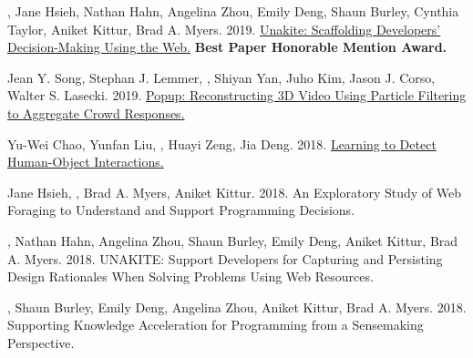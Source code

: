 



\begin{cvpubs}

  {, Jane Hsieh, Nathan Hahn, Angelina Zhou, Emily Deng, Shaun Burley, Cynthia Taylor, Aniket Kittur, Brad A. Myers. 2019. \href{http://dx.doi.org/10.1145/3332165.3347908}{Unakite: Scaffolding Developers' Decision-Making Using the Web.}  \textbf{Best Paper Honorable Mention Award.}} %

{Jean Y. Song, Stephan J. Lemmer, , Shiyan Yan, Juho Kim, Jason J. Corso, Walter S. Lasecki. 2019. \href{https://doi.org/10.1145/3301275.3302305}{Popup: Reconstructing 3D Video Using Particle Filtering to Aggregate Crowd Responses.} } %

{Yu-Wei Chao, Yunfan Liu, , Huayi Zeng, Jia Deng. 2018. \href{https://doi.org/10.1109/WACV.2018.00048}{Learning to Detect Human-Object Interactions.} } %
\end{cvpubs}




\begin{cvpubs}
{Jane Hsieh, , Brad A. Myers, Aniket Kittur. 2018. An Exploratory Study of Web Foraging to Understand and Support Programming Decisions. } %
\end{cvpubs}




\begin{cvpubs}
{, Nathan Hahn, Angelina Zhou, Shaun Burley, Emily Deng, Aniket Kittur, Brad A. Myers. 2018. UNAKITE: Support Developers for Capturing and Persisting Design Rationales When Solving Problems Using Web Resources. } %

{, Shaun Burley, Emily Deng, Angelina Zhou, Aniket Kittur, Brad A. Myers. 2018. Supporting Knowledge Acceleration for Programming from a Sensemaking Perspective. } %
\end{cvpubs}



